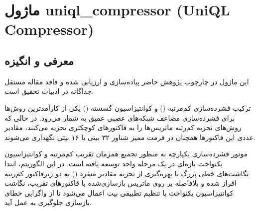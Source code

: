 \section{ماژول uniql\_compressor (UniQL Compressor)}
\label{sec:module_uniql_compressor}

\subsection{معرفی و انگیزه}
این ماژول در چارچوب پژوهش حاضر پیاده‌سازی و ارزیابی شده و فاقد مقاله مستقل جداگانه در ادبیات تحقیق است.

ترکیب فشرده‌سازی کم‌مرتبه () و کوانتیزاسیون گسسته () یکی از کارآمدترین روش‌ها برای فشرده‌سازی مضاعف شبکه‌های عصبی عمیق به شمار می‌رود. در حالی که روش‌های تجزیه کم‌رتبه ماتریس‌ها را به فاکتورهای کوچکتری تجزیه می‌کنند، مقادیر عددی این فاکتورها همچنان در فرمت ممیز شناور ۳۲ بیتی یا ۱۶ بیتی نگهداری می‌شوند.

موتور فشرده‌سازی یکپارچه  به منظور تجمیع همزمان تقریب کم‌مرتبه و کوانتیزاسیون یکنواخت بازه‌ای در یک مرحله واحد توسعه یافته است. در این الگوریتم، ابتدا نگاشت‌های خطی بزرگ با بهره‌گیری از تجزیه مقادیر منفرد () به دو زیرفاکتور کم‌رتبه افراز شده و بلافاصله بر روی ماتریس بازسازی‌شده یا فاکتورهای تقریب، نگاشت کوانتیزاسیون یکنواخت با تنظیم تطبیقی بیت اعمال می‌شود تا از واگرایی خطای بازسازی جلوگیری به عمل آید.

